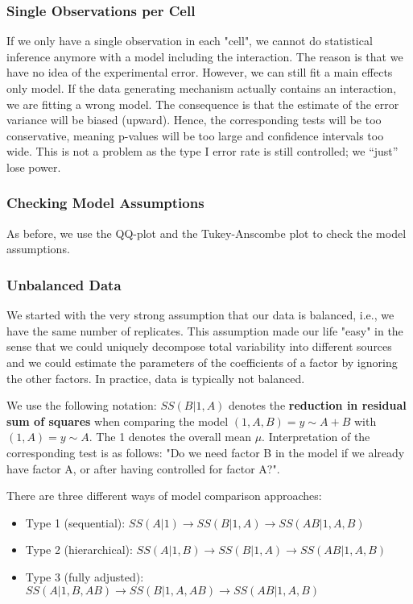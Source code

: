 \subsubsection{Single Observations per Cell}

If we only have a single observation in each "cell", we cannot do statistical inference anymore with a model including the interaction. The reason is that we have no idea of the experimental error. However, we can still fit a main effects only model. If the data generating mechanism actually contains an interaction, we are fitting a wrong model. The consequence is that the estimate of the error variance will be biased (upward). Hence, the corresponding tests will be too conservative, meaning p-values will be too large and confidence intervals too wide. This is not a problem as the type I error rate is still controlled; we “just” lose power.

\subsubsection{Checking Model Assumptions}

As before, we use the QQ-plot and the Tukey-Anscombe plot to check the model assumptions.

\subsubsection{Unbalanced Data}

We started with the very strong assumption that our data is balanced, i.e., we have the same number of replicates. This assumption made our life "easy" in the sense that we could uniquely decompose total variability into different sources and we could estimate the parameters of the coefficients of a factor by ignoring the other factors. In practice, data is typically not balanced. \medskip

We use the following notation: $SS( B | 1, A)$ denotes the \textbf{reduction in residual sum of squares} when comparing the model $(1, A, B) = y \sim A + B$ with $(1, A) = y \sim A$. The 1 denotes the overall mean $\mu$. Interpretation of the corresponding test is as follows: "Do we need factor B in the model if we already have factor A, or after having controlled for factor A?". \medskip

There are three different ways of model comparison approaches:
\begin{itemize}
	\item Type 1 (sequential): $SS(A | 1) \to SS(B | 1, A) \to SS(AB | 1, A, B)$
	\item Type 2 (hierarchical): $SS(A | 1, B) \to SS(B | 1, A) \to SS(AB | 1, A, B)$
	\item Type 3 (fully adjusted): $SS(A | 1, B, AB) \to SS(B | 1, A, AB) \to SS(AB | 1, A, B)$
\end{itemize}

